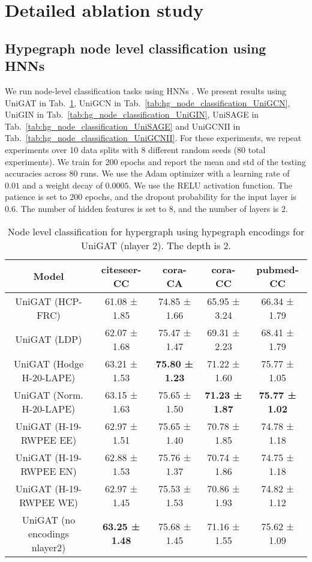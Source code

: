 \section{Detailed ablation study}
\subsection{Hypegraph node level classification using HNNs}\label{hypergraph-level-prediction}
\label{appendix:ablations}

We run node-level classification tasks using HNNs \citep{huang2021unignn}. We present results using UniGAT in Tab.~\ref{tab:hg_node_classification_UniGAT}, UniGCN in Tab.~\ref{tab:hg_node_classification_UniGCN}, UniGIN in Tab.~\ref{tab:hg_node_classification_UniGIN}, UniSAGE in Tab.~\ref{tab:hg_node_classification_UniSAGE} and UniGCNII in Tab.~\ref{tab:hg_node_classification_UniGCNII}. For these experiments, we repeat experiments over 10 data splits \citep{yadati2019hypergcn} with
8 different random seeds (80 total experiments). We train for 200 epochs and report the mean and std of the testing accuracies across 80 runs. We use the Adam optimizer with a learning rate  of $0.01$ and a weight decay of $0.0005$. We use the RELU activation function. The patience is set to 200 epochs, and the dropout probability for the input layer is 0.6. The number of hidden features is set to 8, and the number of layers is 2. 


\begin{table}[H]
\footnotesize
\centering
\begin{tabular}{|c|c|c|c|c|}
\hline
Model & citeseer-CC & cora-CA & cora-CC & pubmed-CC \\
\hline
UniGAT (HCP-FRC) & 61.08 ± 1.85 & 74.85 ± 1.66 & 65.95 ± 3.24 & 66.34 ± 1.79 \\
UniGAT (LDP) & 62.07 ± 1.68 & 75.47 ± 1.47 & 69.31 ± 2.23 & 68.41 ± 1.79 \\
UniGAT (Hodge H-20-LAPE) & 63.21 ± 1.53 & \textbf{75.80 ± 1.23} & 71.22 ± 1.60 & 75.77 ± 1.05 \\
UniGAT (Norm. H-20-LAPE) & 63.15 ± 1.63 & 75.65 ± 1.50 & \textbf{71.23 ± 1.87} & \textbf{75.77 ± 1.02} \\
UniGAT (H-19-RWPEE EE) & 62.97 ± 1.51 & 75.65 ± 1.40 & 70.78 ± 1.85 & 74.78 ± 1.18 \\
UniGAT (H-19-RWPEE EN) & 62.88 ± 1.53 & 75.76 ± 1.37 & 70.74 ± 1.86 & 74.75 ± 1.18 \\
UniGAT (H-19-RWPEE WE) & 62.97 ± 1.45 & 75.53 ± 1.53 & 70.86 ± 1.93 & 74.82 ± 1.12 \\
\hline
UniGAT (no encodings nlayer2) & \textbf{63.25 ± 1.48} & 75.68 ± 1.45 & 71.16 ± 1.55 & 75.62 ± 1.09 \\
\hline
\end{tabular}
\caption{Node level classification for hypergraph using hypegraph encodings for UniGAT (nlayer 2). The depth is 2.}
\label{tab:hg_node_classification_UniGAT}
\end{table}

